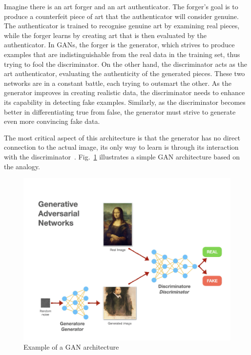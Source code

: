 \noindent Imagine there is an art forger and an art authenticator. The forger's goal is to produce a counterfeit piece of art that the authenticator will consider genuine. The authenticator is trained to recognise genuine art by examining real pieces, while the forger learns by creating art that is then evaluated by the authenticator. In GANs, the forger is the generator, which strives to produce examples that are indistinguishable from the real data in the training set, thus trying to fool the discriminator. On the other hand, the discriminator acts as the art authenticator, evaluating the authenticity of the generated pieces. 
These two networks are in a constant battle, each trying to outsmart the other. As the generator improves in creating realistic data, the discriminator needs to enhance its capability in detecting fake examples. Similarly, as the discriminator becomes better in differentiating true from false, the generator must strive to generate even more convincing fake data. 

\noindent The most critical aspect of this architecture is that the generator has no direct connection to the actual image, its only way to learn is through its interaction with the discriminator~\cite{GeneratingNewRealityBook}. Fig.~\ref{fig:GAN architecture} illustrates a simple GAN architecture based on the analogy.
\begin{figure}[h!]
\centering
  \includegraphics[scale=0.6]{figures/GANs-ex-art.png}
  \caption{Example of a GAN architecture}
  \label{fig:GAN architecture}
\end{figure}

